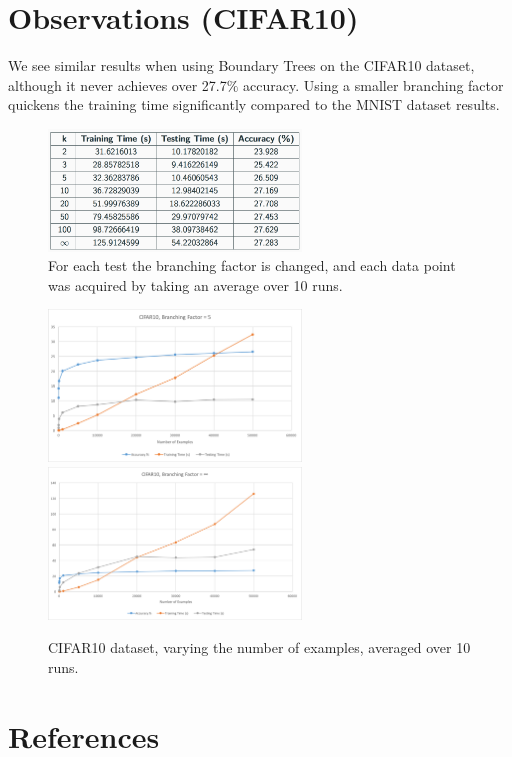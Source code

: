 \documentclass[10pt,letterpaper]{article}
\begin{document}
		
		\section{Observations (CIFAR10)}
		\hspace{5mm}We see similar results when using Boundary Trees on the CIFAR10 dataset, although it never achieves over 27.7$\%$ accuracy. Using a smaller branching factor quickens the training time significantly compared to the MNIST dataset results.
		
		\begin{figure}[H]
			\caption{For each test the branching factor is changed, and each data point was acquired by taking an average over 10 runs.}
			\centering
			\includegraphics[width=0.60\textwidth]{cifar10_varying_k.png}
		\end{figure}
		
		\begin{figure}[H]
		\caption{CIFAR10 dataset, varying the number of examples, averaged over 10 runs.}
		\centering
		\includegraphics[width=0.60\textwidth]{cifar10k5.png}
		\includegraphics[width=0.60\textwidth]{cifar10kinfinity.png}
		\end{figure}
		
		\section{References}
		
\end{document}
